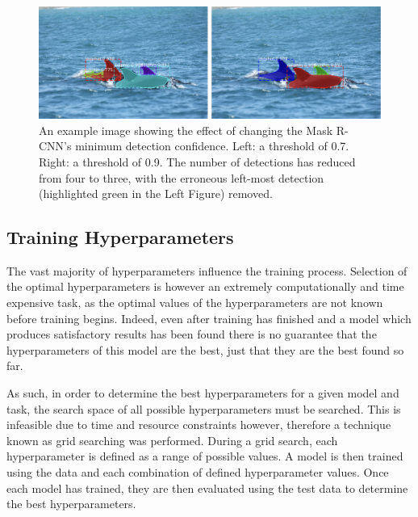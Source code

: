 \begin{figure}[h]
	\begin{center}
		\includegraphics[scale=0.55]{Chapter4/figs/min-conf-eg.png}
	\end{center}
	\caption[An example image showing the effect of changing the Mask R-CNN's minimum detection confidence.]{An example image showing the effect of changing the Mask R-CNN's minimum detection confidence. Left: a threshold of 0.7. Right: a threshold of 0.9. The number of detections has reduced from four to three, with the erroneous left-most detection (highlighted green in the Left Figure) removed.}
	\label{fig:min-conf}
\end{figure}
 
 
\subsection{Training Hyperparameters}\label{ch:cetDet,sec:ModelSelection,sub:TrainingHyperparameters}

The vast majority of hyperparameters influence the training process. Selection of the optimal hyperparameters is however an extremely computationally and time expensive task, as the optimal values of the hyperparameters are not known before training begins. Indeed, even after training has finished and a model which produces satisfactory results has been found there is no guarantee that the hyperparameters of this model are the best, just that they are the best found so far. 

As such, in order to determine the best hyperparameters for a given model and task, the search space of all possible hyperparameters must be searched. This is infeasible due to time and resource constraints however, therefore a technique known as grid searching was performed. During a grid search, each hyperparameter is defined as a range of possible values. A model is then trained using the data and each combination of defined hyperparameter values. Once each model has trained, they are then evaluated using the test data to determine the best hyperparameters.

